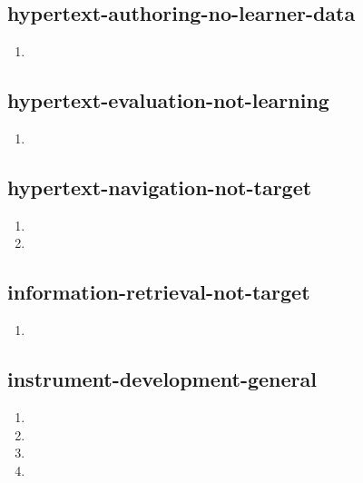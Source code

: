\documentclass{article}
\begin{document}
\subsection{hypertext-authoring-no-learner-data}
\begin{enumerate}
\item {}
\end{enumerate}

\subsection{hypertext-evaluation-not-learning}
\begin{enumerate}
\item {}
\end{enumerate}

\subsection{hypertext-navigation-not-target}
\begin{enumerate}
\item {}
\item {}
\end{enumerate}

\subsection{information-retrieval-not-target}
\begin{enumerate}
\item {}
\end{enumerate}

\subsection{instrument-development-general}
\begin{enumerate}
\item {}
\item {}
\item {}
\item {}
\end{enumerate}
\end{document}
